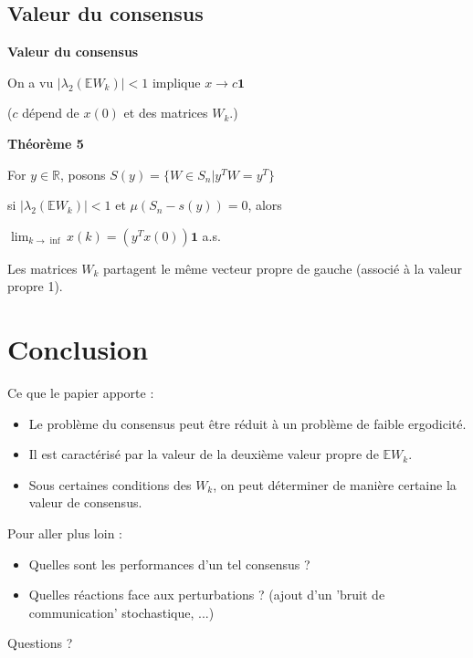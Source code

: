 \documentclass{beamer}
\begin{document}
	\subsection{Valeur du consensus}
\begin{frame}
	\textbf{Valeur du consensus}

	On a vu $| \lambda_2(\mathbb{E}W_k)| < 1$ implique $x \to c\textbf{1}$

	($c$ dépend de $x(0)$ et des matrices $W_k$.)

	\bigbreak
	\pause
	\textbf{Théorème 5}

	For $y \in \mathbb{R}$, posons $S(y) = \{W \in S_n | y^TW = y^T\}$

	si $| \lambda_2(\mathbb{E}W_k)| < 1$ et $\mu (S_n - s(y)) = 0$, alors

	\begin{center}
		$\lim_{k \to \inf}x(k) = (y^Tx(0))\textbf{1}$ \quad a.s.		
	\end{center}
	\pause
	Les matrices $W_k$ partagent le même vecteur propre de gauche
	(associé à la valeur propre 1).
\end{frame}


\section*{Conclusion}
\begin{frame}
	Ce que le papier apporte :
	\begin{itemize}
		\item Le problème du consensus peut être réduit à un problème de faible ergodicité.
		\item Il est caractérisé par la valeur de la deuxième valeur propre de $\mathbb{E}W_k$.
		\item Sous certaines conditions des $W_k$, on peut déterminer de manière certaine la valeur de consensus.
	\end{itemize}
	\pause
	Pour aller plus loin :
	\begin{itemize}
		\item Quelles sont les performances d'un tel consensus ?
		\item Quelles réactions face aux perturbations ? (ajout d'un 'bruit de communication' stochastique, ...)
	\end{itemize}
\end{frame}

\begin{frame}
	\begin{center}
		\LARGE Questions ?
	\end{center}
\end{frame}
\end{document}
